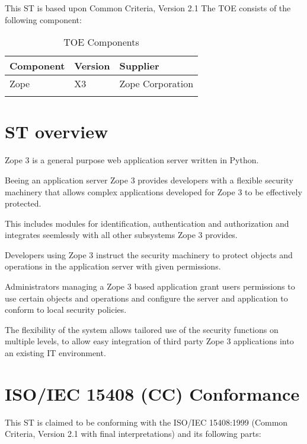 \documentclass[12pt,english]{scrbook}
\begin{document}
This ST is based upon Common Criteria, Version 2.1 
The TOE consists of the following component:

\begin{longtable}[c]{lll}
  \toprule
  Component & Version & Supplier \\
  \midrule \endhead
  Zope & X3 & Zope Corporation \\
  \bottomrule
  \caption{TOE Components}
\end{longtable}



\section{ST overview}

Zope 3 is a general purpose web application server written in Python. 

Beeing an application server Zope 3 provides developers with a flexible
security machinery that allows complex applications developed for Zope 3 to be
effectively protected.

This includes modules for identification, authentication and authorization and
integrates seemlessly with all other subsystems Zope 3 provides.

Developers using Zope 3 instruct the security machinery to protect objects and
operations in the application server with given permissions.

Administrators managing a Zope 3 based application grant users permissions to
use certain objects and operations and configure the server and application to
conform to local security policies.

The flexibility of the system allows tailored use of the security functions on
multiple levels, to allow easy integration of third party Zope 3 applications
into an existing IT environment.




\section{ISO/IEC 15408 (CC) Conformance}

This ST is claimed to be conforming with the ISO/IEC 15408:1999 (Common
Criteria, Version 2.1 with final interpretations) and its following
parts:
\end{document}
